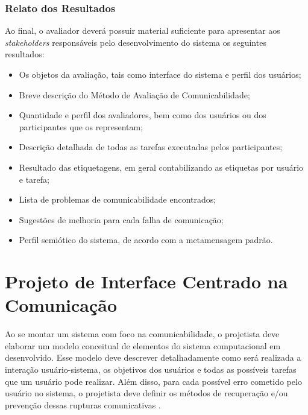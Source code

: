 \subsubsection{Relato dos Resultados}

\indent Ao final, o avaliador deverá possuir material suficiente para apresentar aos \textit{stakeholders} responsáveis pelo desenvolvimento do sistema os seguintes resultados:

\begin{itemize}
\item Os objetos da avaliação, tais como interface do sistema e perfil dos usuários;
\item Breve descrição do Método de Avaliação de Comunicabilidade;
\item Quantidade e perfil dos avaliadores, bem como dos usuários ou dos participantes que os representam;
\item Descrição detalhada de todas as tarefas executadas pelos participantes;
\item Resultado das etiquetagens, em geral contabilizando as etiquetas por usuário e tarefa;
\item Lista de problemas de comunicabilidade encontrados;
\item Sugestões de melhoria para cada falha de comunicação;
\item Perfil semiótico do sistema, de acordo com a metamensagem padrão.
\end{itemize}










\section{Projeto de Interface Centrado na Comunicação}

\indent Ao se montar um sistema com foco na comunicabilidade, o projetista deve elaborar um modelo conceitual de elementos do sistema computacional em desenvolvido. Esse modelo deve descrever detalhadamente como será realizada a interação usuário-sistema, os objetivos dos usuários e todas as possíveis tarefas que um usuário pode realizar. Além disso, para cada possível erro cometido pelo usuário no sistema, o projetista deve definir os métodos de recuperação e/ou prevenção dessas rupturas comunicativas \cite{IHCbook}.

